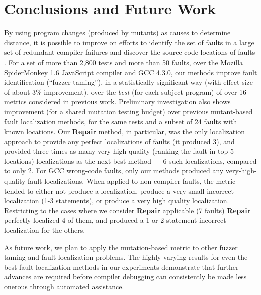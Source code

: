 \section{Conclusions and Future Work}
\label{conc}
 By using program changes
(produced by mutants) as
causes to determine distance, it is possible to improve on efforts
to identify the set of faults in a large set of redundant compiler failures
\cite{PLDI13} and discover the source code locations of faults
\cite{MUSE,multilingual}.  For a set of more than 2,800 tests and more
than 50 faults, over the Mozilla SpiderMonkey 1.6 JavaScript compiler and
GCC 4.3.0, our methods improve fault identification (``fuzzer taming''), in a statistically significant way
(with effect size of about 3\% improvement), over
the \emph{best} (for each subject program) of over 16 metrics considered in previous work.
Preliminary investigation also shows improvement (for a shared
mutation testing budget) over previous mutant-based fault localization
methods, for the same tests and a subset of 24 faults with known
locations.  Our {\bf Repair} method, in particular, was the only
localization approach to provide any perfect localizations of faults
(it produced 3),
and provided three times as many very-high-quality (ranking the fault
in top 5 locations) localizations as the next best method
\cite{multilingual}  --- 6 such localizations, compared to only 2.
For GCC wrong-code faults, only our methods produced any
very-high-quality fault localizations.  When applied to non-compiler
faults, the metric tended to either not produce a localization,
produce a very small incorrect localization (1-3 statements), or
produce a very high quality localization.  Restricting to the cases
where we consider {\bf Repair} applicable (7 faults) {\bf Repair}
perfectly localized 4 of them, and produced a 1 or 2 statement
incorrect localization for the others.

As future work, we plan to apply the mutation-based metric to other
fuzzer taming and fault localization problems.  The highly varying
results for even the best fault localization methods in our
experiments demonstrate that further advances are required before
compiler debugging can consistently be made less onerous through automated
assistance.  

